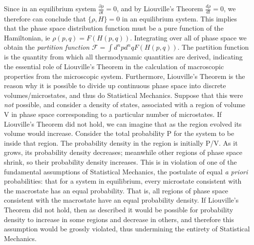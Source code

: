 Since in an equilibrium system $\frac{\partial\rho}{\partial t} = 0$, and by Liouville's Theorem $\frac{d\rho}{dt} = 0$, we therefore can conclude that $\{\rho, H\}=0$ in an equilibrium system. This implies that the phase space distribution function must be a pure function of the Hamiltonian, ie $\rho(p,q) = F(H(p,q))$. Integrating over all of phase space we obtain the \textit{partition function} $\mathcal{F} = \int d^{n}pd^{n}qF(H(p,q))$. The partition function is the quantity from which all thermodynamic quantities are derived, indicating the essential role of Liouville's Theorem in the calculation of macroscopic properties from the microscopic system. Furthermore, Liouville's Theorem is the reason why it is possible to divide up continuous phase space into discrete volumes/microstates, and thus do Statistical Mechanics. Suppose that this were \textit{not} possible, and consider a density of states, associated with a region of volume V in phase space corresponding to a particular number of microstates. If Liouville's Theorem did not hold, we can imagine that as the region evolved its volume would increase. Consider the total probability P for the system to be inside that region. The probability density in the region is initially P/V. As it grows, its probability density decreases; meanwhile other regions of phase space shrink, so their probability density increases. This is in violation of one of the fundamental assumptions of Statistical Mechanics, the postulate of equal \textit{a priori} probabilities: that for a system in equilibrium, every microstate consistent with the macrostate has an equal probability. That is, all regions of phase space consistent with the macrostate have an equal probability density. If Liouville's Theorem did not hold, then as described it would be possible for probability density to increase in some regions and decrease in others, and therefore this assumption would be grossly violated, thus undermining the entirety of Statistical Mechanics.

